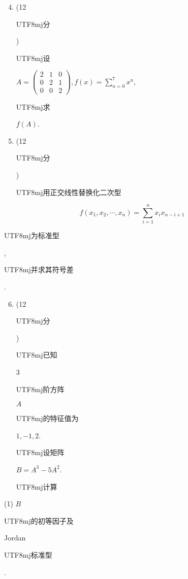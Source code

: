\documentclass[10pt]{article}
\begin{document}
\begin{enumerate}
  \setcounter{enumi}{3}
  \item (12 \begin{CJK}{UTF8}{mj}分\end{CJK}) \begin{CJK}{UTF8}{mj}设\end{CJK} $A=\left(\begin{array}{lll}2 & 1 & 0 \\ 0 & 2 & 1 \\ 0 & 0 & 2\end{array}\right), f(x)=\sum_{n=0}^{7} x^{n}$, \begin{CJK}{UTF8}{mj}求\end{CJK} $f(A)$.

  \item (12 \begin{CJK}{UTF8}{mj}分\end{CJK}) \begin{CJK}{UTF8}{mj}用正交线性替换化二次型\end{CJK}

\end{enumerate}
$$
f\left(x_{1}, x_{2}, \cdots, x_{n}\right)=\sum_{i=1}^{n} x_{i} x_{n-i+1}
$$
\begin{CJK}{UTF8}{mj}为标准型\end{CJK}, \begin{CJK}{UTF8}{mj}并求其符号差\end{CJK}.

\begin{enumerate}
  \setcounter{enumi}{5}
  \item (12 \begin{CJK}{UTF8}{mj}分\end{CJK}) \begin{CJK}{UTF8}{mj}已知\end{CJK} 3 \begin{CJK}{UTF8}{mj}阶方阵\end{CJK} $A$ \begin{CJK}{UTF8}{mj}的特征值为\end{CJK} $1,-1,2$. \begin{CJK}{UTF8}{mj}设矩阵\end{CJK} $B=A^{3}-5 A^{2}$. \begin{CJK}{UTF8}{mj}计算\end{CJK}
\end{enumerate}
(1) $B$ \begin{CJK}{UTF8}{mj}的初等因子及\end{CJK} Jordan \begin{CJK}{UTF8}{mj}标准型\end{CJK}.
\end{document}
